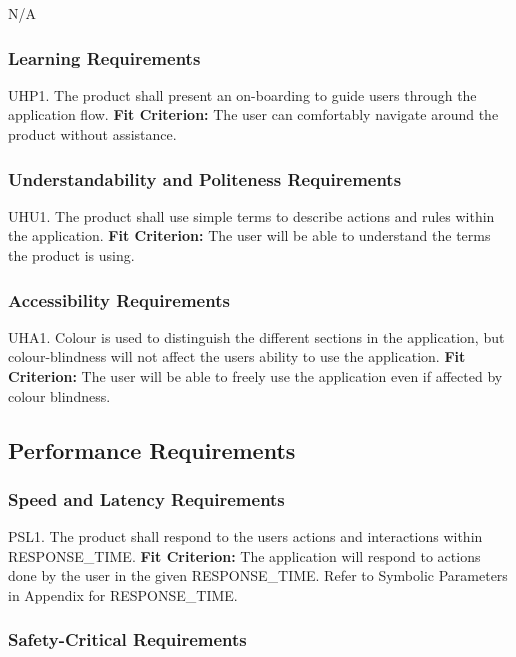 \documentclass[12pt, titlepage]{article}
\begin{document}
N/A

\subsubsection{Learning Requirements}

UHP1. The product shall present an on-boarding to guide users through the application flow.
  \textbf{Fit Criterion:} The user can comfortably navigate around the product without assistance. 

\subsubsection{Understandability and Politeness Requirements}

UHU1. The product shall use simple terms to describe actions and rules within the application.
	\textbf{Fit Criterion:} The user will be able to understand the terms the product is using.

\subsubsection{Accessibility Requirements}

UHA1. Colour is used to distinguish the different sections in the application, but colour-blindness will not affect the users ability to use the application.
	\textbf{Fit Criterion:} The user will be able to freely use the application even if affected by 
colour blindness.

\subsection{Performance Requirements}

\subsubsection{Speed and Latency Requirements}

PSL1. The product shall respond to the users actions and interactions within RESPONSE\_TIME.
	\textbf{Fit Criterion:} The application will respond to actions done by the user in the given 
RESPONSE\_TIME. Refer to Symbolic Parameters in Appendix for RESPONSE\_TIME.

\subsubsection{Safety-Critical Requirements}
\end{document}
